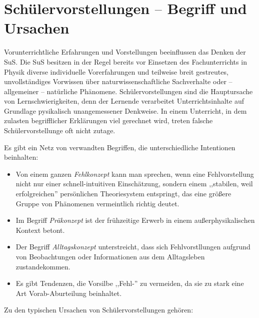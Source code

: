 \bip\bip
\section{Sch{\"u}lervorstellungen $\textrm{--}$  Begriff und Ursachen}
Vorunterrichtliche Erfahrungen und Vorstellungen beeinflussen das Denken der SuS. Die SuS besitzen in der Regel bereits vor Einsetzen des Fachunterrichts in Physik diverse individuelle Vorerfahrungen und teilweise breit gestreutes, unvollst{\"a}ndiges Vorwissen {\"u}ber naturwissenschaftliche Sachverhalte oder $\textrm{--}$ allgemeiner $\textrm{--}$ nat{\"u}rliche Ph{\"a}nomene. Sch{\"u}lervorstellungen sind die Hauptursache von Lernschwierigkeiten, denn der Lernende verarbeitet Unterrichtsinhalte auf Grundlage pysikalisch unangemessener Denkweise. In einem Unterricht, in dem zulasten begrifflicher Erkl{\"a}rungen viel gerechnet wird, treten falsche Sch{\"u}lervorstellunge oft nicht zutage. 

Es gibt ein Netz von verwandten Begriffen, die unterschiedliche Intentionen beinhalten:

\begin{itemize}
\item Von einem ganzen \emph{Fehlkonzept} kann man sprechen, wenn eine Fehlvorstellung nicht nur einer
schnell-intuitiven Einsch\"{a}tzung, sondern einem ,,stabilen, weil erfolgreichen'' pers\"{o}nlichen
Theoriesystem entspringt, das eine gr\"{o}{\ss}ere Gruppe von Ph\"{a}nomenen vermeintlich richtig deutet.
\item
Im Begriff \emph{Pr\"{a}konzept} ist der fr\"{u}hzeitige Erwerb in einem au{\ss}erphysikalischen Kontext betont.
\item
Der Begriff \emph{Alltagskonzept} unterstreicht, dass sich Fehlvorstllungen aufgrund von Beobachtungen
oder Informationen aus dem Alltagsleben zustandekommen.
\item
Es gibt Tendenzen, die Vorsilbe ,,Fehl-'' zu vermeiden, da sie zu stark eine Art Vorab-Aburteilung beinhaltet.
\end{itemize}

\bip


Zu den typischen Ursachen von Sch{\"u}lervorstellungen geh{\"o}ren:

